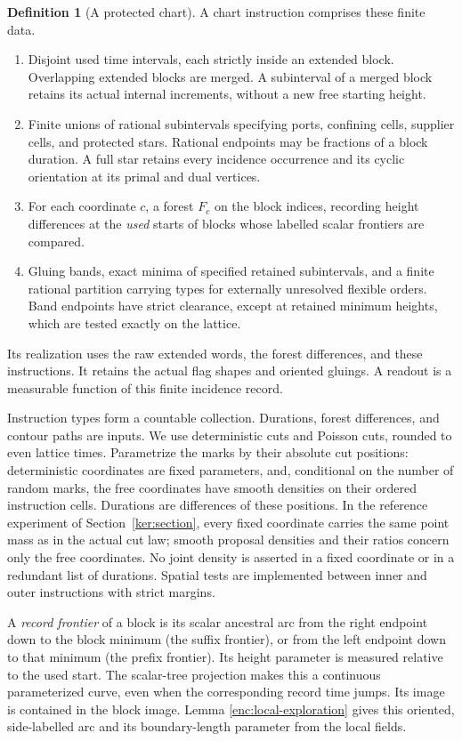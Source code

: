 \documentclass[11pt]{article}
\numberwithin{equation}{section}
\theoremstyle{definition}
\newtheorem{definition}[theorem]{Definition}
\theoremstyle{remark}
\newcommand{\1}{\mathbf 1}
\begin{document}
\begin{definition}[A protected chart]\label{ker:chart}
A chart instruction comprises these finite data.
\begin{enumerate}
\item Disjoint used time intervals, each strictly inside an extended
block.  Overlapping extended blocks are merged.  A subinterval of a
merged block retains its actual internal increments, without a new
free starting height.
\item Finite unions of rational subintervals specifying ports, confining
cells, supplier cells, and protected stars.  Rational endpoints may be
fractions of a block duration.  A full star retains every incidence
occurrence and its cyclic orientation at its primal and dual vertices.
\item For each coordinate \(c\), a forest \(F_c\) on the block indices,
recording height differences at the \emph{used} starts of blocks whose
labelled scalar frontiers are compared.
\item Gluing bands, exact minima of specified retained subintervals,
and a finite rational partition carrying types for externally unresolved
flexible orders.  Band endpoints have strict clearance, except at
retained minimum heights, which are tested exactly on the lattice.
\end{enumerate}
Its realization uses the raw extended words, the forest differences,
and these instructions.  It retains the actual flag shapes and
oriented gluings.  A readout is a measurable function of this finite
incidence record.
\end{definition}

Instruction types form a countable collection.  Durations, forest
differences, and contour paths are inputs.  We use deterministic cuts
and Poisson cuts, rounded to even lattice times.  Parametrize the
marks by their absolute cut positions: deterministic coordinates
are fixed parameters, and, conditional on the number of random
marks, the free coordinates have smooth densities on their ordered
instruction cells.  Durations are differences of these positions.
In the reference experiment of Section~\ref{ker:section}, every fixed
coordinate carries the same point mass as in the actual cut law;
smooth proposal densities and their ratios concern only the free
coordinates.  No joint density is asserted in a fixed coordinate
or in a redundant list of durations.  Spatial tests are implemented
between inner and outer instructions with strict margins.

A \emph{record frontier} of a block is its scalar ancestral arc
from the right endpoint down to the block minimum (the suffix
frontier), or from the left endpoint down to that minimum (the prefix
frontier).  Its height parameter is measured relative to the used
start.  The scalar-tree projection makes this a continuous
parameterized curve, even when the corresponding record time jumps.
Its image is contained in the block image.  Lemma
\ref{enc:local-exploration} gives this oriented, side-labelled arc and
its boundary-length parameter from the local fields.
\end{document}
